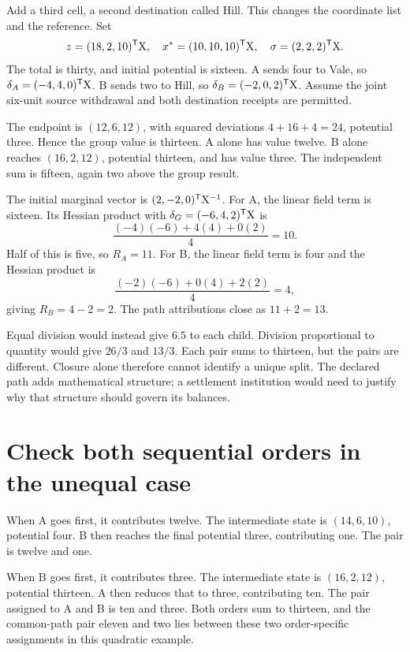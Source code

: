 Add a third cell, a second destination called Hill. This changes the coordinate list and the reference. Set
\begin{equation}
z=(18,2,10)^{\mathsf T}\mathrm{X},
\quad x^*=(10,10,10)^{\mathsf T}\mathrm{X},
\quad\sigma=(2,2,2)^{\mathsf T}\mathrm{X}.
\end{equation}
The total is thirty, and initial potential is sixteen. A sends four to Vale, so \(\delta_A=(-4,4,0)^{\mathsf T}\mathrm{X}\). B sends two to Hill, so \(\delta_B=(-2,0,2)^{\mathsf T}\mathrm{X}\). Assume the joint six-unit source withdrawal and both destination receipts are permitted.

The endpoint is \((12,6,12)\), with squared deviations \(4+16+4=24\), potential three. Hence the group value is thirteen. A alone has value twelve. B alone reaches \((16,2,12)\), potential thirteen, and has value three. The independent sum is fifteen, again two above the group result.

The initial marginal vector is \((2,-2,0)^{\mathsf T}\mathrm{X}^{-1}\). For A, the linear field term is sixteen. Its Hessian product with \(\delta_G=(-6,4,2)^{\mathsf T}\mathrm{X}\) is
\begin{equation}
\frac{(-4)(-6)+4(4)+0(2)}4=10.
\end{equation}
Half of this is five, so \(R_A=11\). For B, the linear field term is four and the Hessian product is
\begin{equation}
\frac{(-2)(-6)+0(4)+2(2)}4=4,
\end{equation}
giving \(R_B=4-2=2\). The path attributions close as \(11+2=13\).

Equal division would instead give \(6.5\) to each child. Division proportional to quantity would give \(26/3\) and \(13/3\). Each pair sums to thirteen, but the pairs are different. Closure alone therefore cannot identify a unique split. The declared path adds mathematical structure; a settlement institution would need to justify why that structure should govern its balances.

\section{Check both sequential orders in the unequal case}

When A goes first, it contributes twelve. The intermediate state is \((14,6,10)\), potential four. B then reaches the final potential three, contributing one. The pair is twelve and one.

When B goes first, it contributes three. The intermediate state is \((16,2,12)\), potential thirteen. A then reduces that to three, contributing ten. The pair assigned to A and B is ten and three. Both orders sum to thirteen, and the common-path pair eleven and two lies between these two order-specific assignments in this quadratic example.

